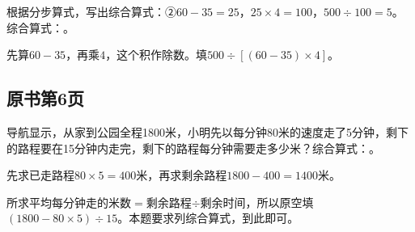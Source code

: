 根据分步算式，写出综合算式：②\(60-35=25\)，\allowbreak{}\(25\times4=100\)，\allowbreak{}\(500\div100=5\)。综合算式：\BookBlank{}。\par
\begin{BookAnswer}
先算\(60-35\)，再乘\(4\)，这个积作除数。填\(500\div[(60-35)\times4]\)。
\end{BookAnswer}



\subsection*{原书第6页}

导航显示，从家到公园全程1800米，小明先以每分钟80米的速度走了5分钟，剩下的路程要在15分钟内走完，剩下的路程每分钟需要走多少米？综合算式：\BookBlank{}。\par
\begin{BookAnswer}
先求已走路程\(80\times5=400\)米，再求剩余路程\(1800-400=1400\)米。\par 所求平均每分钟走的米数\(=\)剩余路程\(\div\)剩余时间，所以原空填\((1800-80\times5)\div15\)。本题要求列综合算式，到此即可。
\end{BookAnswer}

